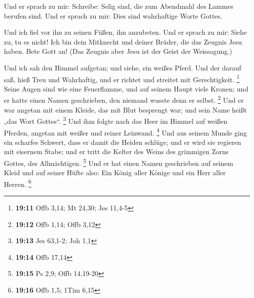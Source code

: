  Und er sprach zu mir: Schreibe: Selig sind, die zum
Abendmahl des Lammes berufen sind. Und er sprach zu mir: Dies sind
wahrhaftige Worte Gottes.

 Und ich fiel vor ihn zu seinen Füßen, ihn anzubeten. Und
er sprach zu mir: Siehe zu, tu es nicht! Ich bin dein Mitknecht und
deiner Brüder, die das Zeugnis Jesu haben. Bete Gott an! (Das Zeugnis
aber Jesu ist der Geist der Weissagung.)

 Und ich sah den Himmel aufgetan; und siehe, ein weißes
Pferd. Und der darauf saß, hieß Treu und Wahrhaftig, und er richtet und
streitet mit Gerechtigkeit. \footnote{\textbf{19:11} Offb 3,14; Mt
  24,30; Jes 11,4-5}  Seine Augen sind wie eine
Feuerflamme, und auf seinem Haupt viele Kronen; und er hatte einen Namen
geschrieben, den niemand wusste denn er selbst. \footnote{\textbf{19:12}
  Offb 1,14; Offb 3,12}  Und er war angetan mit einem
Kleide, das mit Blut besprengt war; und sein Name heißt „das Wort
Gottes``. \footnote{\textbf{19:13} Jes 63,1-2; Joh 1,1} 
Und ihm folgte nach das Heer im Himmel auf weißen Pferden, angetan mit
weißer und reiner Leinwand. \footnote{\textbf{19:14} Offb 17,14}
 Und aus seinem Munde ging ein scharfes Schwert, dass er
damit die Heiden schlüge; und er wird sie regieren mit eisernem Stabe;
und er tritt die Kelter des Weins des grimmigen Zorns Gottes, des
Allmächtigen. \footnote{\textbf{19:15} Ps 2,9; Offb 14,19-20}
 Und er hat einen Namen geschrieben auf seinem Kleid und
auf seiner Hüfte also: Ein König aller Könige und ein Herr aller Herren.
\footnote{\textbf{19:16} Offb 1,5; 1Tim 6,15}

